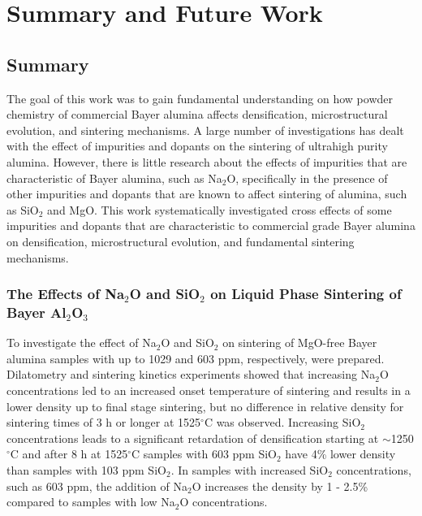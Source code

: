 \chapter{Summary and Future Work}

\section{Summary}
The goal of this work was to gain fundamental understanding on how powder chemistry of commercial Bayer alumina affects densification, microstructural evolution, and sintering mechanisms. A large number of investigations has dealt with the effect of impurities and dopants on the sintering of ultrahigh purity alumina. However, there is little research about the effects of impurities that are characteristic of Bayer alumina, such as Na$_{2}$O, specifically in the presence of other impurities and dopants that are known to affect sintering of alumina, such as SiO$_{2}$ and MgO. This work systematically investigated cross effects of some impurities and dopants that are characteristic to commercial grade Bayer alumina on densification, microstructural evolution, and fundamental sintering mechanisms. 

\subsection{The Effects of Na$_{2}$O and SiO$_{2}$ on Liquid Phase Sintering of Bayer Al$_{2}$O$_{3}$}
To investigate the effect of Na$_{2}$O and SiO$_{2}$ on sintering of MgO-free Bayer alumina samples with up to 1029 and 603 ppm, respectively, were prepared. Dilatometry and sintering kinetics experiments showed that increasing Na$_{2}$O concentrations led to an increased onset temperature of sintering and results in a lower density up to final stage sintering, but no difference in relative density for sintering times of 3 h or longer at 1525$^{\circ}$C was observed. Increasing SiO$_{2}$ concentrations leads to a significant retardation of densification starting at $\sim$1250$^{\circ}$C and after 8 h at 1525$^{\circ}$C samples with 603 ppm SiO$_{2}$ have 4\% lower density than samples with 103 ppm SiO$_{2}$. In samples with increased SiO$_{2}$ concentrations, such as 603 ppm, the addition of Na$_{2}$O increases the density by 1 - 2.5\% compared to samples with low Na$_{2}$O concentrations. 

